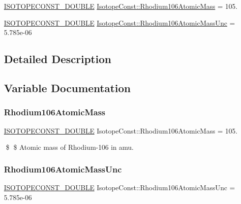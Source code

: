 \begin{DoxyCompactItemize}
\item 
\mbox{\hyperlink{group___isotope_const-_macros_ga8f45a7272ce02c0b4c65c44636ed719a}{I\+S\+O\+T\+O\+P\+E\+C\+O\+N\+S\+T\+\_\+\+D\+O\+U\+B\+LE}} \mbox{\hyperlink{group___isotope_const-_rhodium-_rh106_ga7e7221dd9ff66867e24312b036ff17ad}{Isotope\+Const\+::\+Rhodium106\+Atomic\+Mass}} = 105.
\item 
\mbox{\hyperlink{group___isotope_const-_macros_ga8f45a7272ce02c0b4c65c44636ed719a}{I\+S\+O\+T\+O\+P\+E\+C\+O\+N\+S\+T\+\_\+\+D\+O\+U\+B\+LE}} \mbox{\hyperlink{group___isotope_const-_rhodium-_rh106_gacc233778f1375fba8b34989f15971033}{Isotope\+Const\+::\+Rhodium106\+Atomic\+Mass\+Unc}} = 5.\+785e-\/06
\end{DoxyCompactItemize}


\subsection{Detailed Description}


\subsection{Variable Documentation}
\mbox{\label{group___isotope_const-_rhodium-_rh106_ga7e7221dd9ff66867e24312b036ff17ad}} 
\subsubsection{\texorpdfstring{Rhodium106\+Atomic\+Mass}{Rhodium106AtomicMass}}
{\footnotesize\ttfamily \mbox{\hyperlink{group___isotope_const-_macros_ga8f45a7272ce02c0b4c65c44636ed719a}{I\+S\+O\+T\+O\+P\+E\+C\+O\+N\+S\+T\+\_\+\+D\+O\+U\+B\+LE}} Isotope\+Const\+::\+Rhodium106\+Atomic\+Mass = 105.}

\$ \$ Atomic mass of Rhodium-\/106 in amu. \mbox{\label{group___isotope_const-_rhodium-_rh106_gacc233778f1375fba8b34989f15971033}} 
\subsubsection{\texorpdfstring{Rhodium106\+Atomic\+Mass\+Unc}{Rhodium106AtomicMassUnc}}
{\footnotesize\ttfamily \mbox{\hyperlink{group___isotope_const-_macros_ga8f45a7272ce02c0b4c65c44636ed719a}{I\+S\+O\+T\+O\+P\+E\+C\+O\+N\+S\+T\+\_\+\+D\+O\+U\+B\+LE}} Isotope\+Const\+::\+Rhodium106\+Atomic\+Mass\+Unc = 5.\+785e-\/06}

